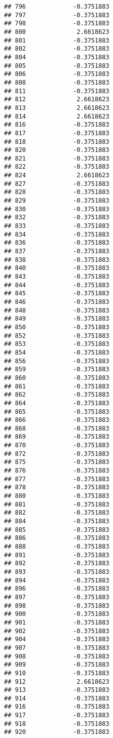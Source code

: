 \documentclass[
]{article}
\begin{document}
\begin{verbatim}
## 796             -0.3751883
## 797             -0.3751883
## 798             -0.3751883
## 800              2.6618623
## 801             -0.3751883
## 802             -0.3751883
## 804             -0.3751883
## 805             -0.3751883
## 806             -0.3751883
## 808             -0.3751883
## 811             -0.3751883
## 812              2.6618623
## 813              2.6618623
## 814              2.6618623
## 816             -0.3751883
## 817             -0.3751883
## 818             -0.3751883
## 820             -0.3751883
## 821             -0.3751883
## 822             -0.3751883
## 824              2.6618623
## 827             -0.3751883
## 828             -0.3751883
## 829             -0.3751883
## 830             -0.3751883
## 832             -0.3751883
## 833             -0.3751883
## 834             -0.3751883
## 836             -0.3751883
## 837             -0.3751883
## 838             -0.3751883
## 840             -0.3751883
## 843             -0.3751883
## 844             -0.3751883
## 845             -0.3751883
## 846             -0.3751883
## 848             -0.3751883
## 849             -0.3751883
## 850             -0.3751883
## 852             -0.3751883
## 853             -0.3751883
## 854             -0.3751883
## 856             -0.3751883
## 859             -0.3751883
## 860             -0.3751883
## 861             -0.3751883
## 862             -0.3751883
## 864             -0.3751883
## 865             -0.3751883
## 866             -0.3751883
## 868             -0.3751883
## 869             -0.3751883
## 870             -0.3751883
## 872             -0.3751883
## 875             -0.3751883
## 876             -0.3751883
## 877             -0.3751883
## 878             -0.3751883
## 880             -0.3751883
## 881             -0.3751883
## 882             -0.3751883
## 884             -0.3751883
## 885             -0.3751883
## 886             -0.3751883
## 888             -0.3751883
## 891             -0.3751883
## 892             -0.3751883
## 893             -0.3751883
## 894             -0.3751883
## 896             -0.3751883
## 897             -0.3751883
## 898             -0.3751883
## 900             -0.3751883
## 901             -0.3751883
## 902             -0.3751883
## 904             -0.3751883
## 907             -0.3751883
## 908             -0.3751883
## 909             -0.3751883
## 910             -0.3751883
## 912              2.6618623
## 913             -0.3751883
## 914             -0.3751883
## 916             -0.3751883
## 917             -0.3751883
## 918             -0.3751883
## 920             -0.3751883

\end{verbatim}
\end{document}
